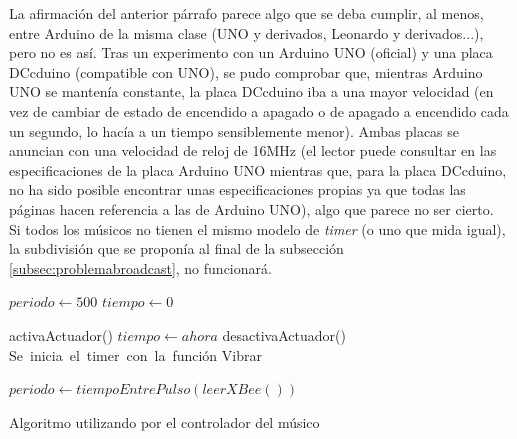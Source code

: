La afirmación del anterior párrafo parece algo que se deba cumplir, al menos, entre
Arduino de la misma clase (UNO y derivados, Leonardo y derivados...), pero no es así.
Tras un experimento con un Arduino UNO (oficial) y una placa DCcduino (compatible con UNO),
se pudo comprobar que, mientras Arduino UNO se mantenía constante, la placa DCcduino iba a una
mayor velocidad (en vez de cambiar de estado de encendido a apagado o de apagado a encendido
cada un segundo, lo hacía a un tiempo sensiblemente menor). Ambas placas se anuncian
con una velocidad de reloj de 16MHz (el lector puede consultar en \cite{arduinoUNO} las
especificaciones de la placa Arduino UNO mientras que, para la placa DCcduino, no ha sido
posible encontrar unas especificaciones propias ya que todas las páginas hacen referencia
a las de Arduino UNO), algo que parece no ser cierto.\\

Si todos los músicos no tienen el mismo modelo de \textit{timer} (o uno que mida igual),
la subdivisión que se proponía al final de la subsección \ref{subsec:problemabroadcast},
no funcionará.\\

\begin{algorithm}
  \begin{algorithmic}[1]
    \State $periodo\gets 500$
    \State $tiempo\gets 0$

       \State activaActuador()
       \State $tiempo \gets ahora$
      \Else {}
        \State desactivaActuador()
         \EndIf
     \EndIf
     \EndFunction\\

     \State Se\ inicia\ el\ timer\ con\ la\ función Vibrar

         \State $periodo\gets tiempoEntrePulso(leerXBee())$
      \EndIf
     \EndWhile
  \end{algorithmic}
  \caption{Algoritmo utilizando por el controlador del músico}
\end{algorithm}

